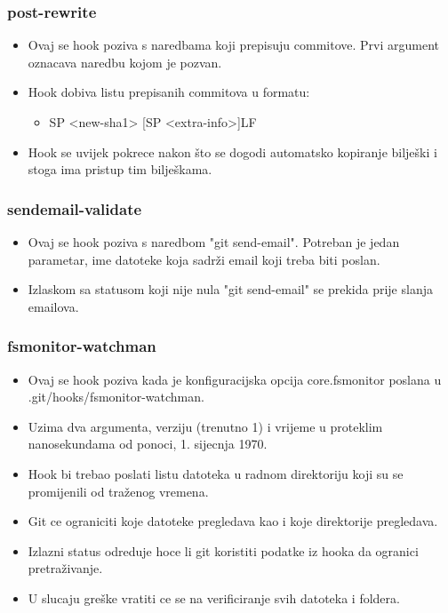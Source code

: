 \documentclass{beamer}
\begin{document}
\begin{frame}
\frametitle{post-rewrite}
\begin{itemize}
    \item Ovaj se hook poziva s naredbama koji prepisuju commitove. Prvi argument oznacava naredbu kojom je pozvan.
    \item Hook dobiva listu prepisanih commitova u formatu:
    \begin{itemize}
        \item <old-sha1> SP <new-sha1> [SP <extra-info>]LF
    \end{itemize}
    \item Hook se uvijek pokrece nakon što se dogodi automatsko kopiranje bilješki i stoga ima pristup tim bilješkama.
\end{itemize}
\end{frame}

\begin{frame}
\frametitle{sendemail-validate}
\begin{itemize}
    \item Ovaj se hook poziva s naredbom "git send-email". Potreban je jedan parametar, ime datoteke koja sadrži email koji treba biti poslan.
    \item Izlaskom sa statusom koji nije nula "git send-email" se prekida prije slanja emailova.

\end{itemize}
\end{frame}

\begin{frame}
\frametitle{fsmonitor-watchman}
\begin{itemize}
    \item Ovaj se hook poziva kada je konfiguracijska opcija core.fsmonitor poslana u .git/hooks/fsmonitor-watchman.
    \item Uzima dva argumenta, verziju (trenutno 1) i vrijeme u proteklim nanosekundama od ponoci, 1. sijecnja 1970.
    \item Hook bi trebao poslati listu datoteka u radnom direktoriju koji su se promijenili od traženog vremena.
    \item Git ce ograniciti koje datoteke pregledava kao i koje direktorije pregledava.
    \item Izlazni status odreduje hoce li git koristiti podatke iz hooka da ogranici pretraživanje.
    \item U slucaju greške vratiti ce se na verificiranje svih datoteka i foldera.
\end{itemize}
\end{frame}
\end{document}
